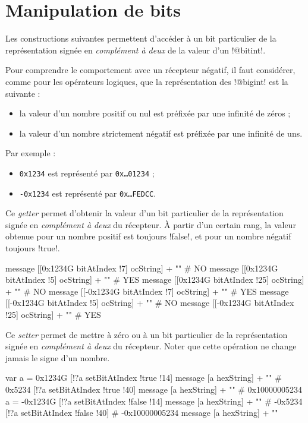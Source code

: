 \section{Manipulation de bits}

Les constructions suivantes permettent d'accéder à un bit particulier de la représentation signée en \emph{complément à deux} de la valeur d'un \ggs!@bitint!.

Pour comprendre le comportement avec un récepteur négatif, il faut considérer, comme pour les opérateurs logiques, que la représentation des \ggs!@bigint! est la suivante :
\begin{itemize}
  \item la valeur d'un nombre positif ou nul est préfixée par une infinité de zéros ;
  \item la valeur d'un nombre strictement négatif est préfixée par une infinité de uns.
\end{itemize}

Par exemple :
\begin{itemize}
  \item \texttt{0x1234} est représenté par \texttt{0x…01234} ;
  \item \texttt{-0x1234} est représenté par \texttt{0x…FEDCC}.
\end{itemize}


Ce \emph{getter} permet d'obtenir la valeur d'un bit particulier de la représentation signée en \emph{complément à deux} du récepteur. À partir d'un certain rang, la valeur obtenue pour un nombre positif est toujours \ggs!false!, et pour un nombre négatif toujours \ggs!true!.

\begin{galgas}
message [[0x1234G bitAtIndex !7] ocString] + "\n" # NO
message [[0x1234G bitAtIndex !5] ocString] + "\n" # YES
message [[0x1234G bitAtIndex !25] ocString] + "\n" # NO
message [[-0x1234G bitAtIndex !7] ocString] + "\n" # YES
message [[-0x1234G bitAtIndex !5] ocString] + "\n" # NO
message [[-0x1234G bitAtIndex !25] ocString] + "\n" # YES
\end{galgas}


Ce \emph{setter} permet de mettre à zéro ou à un bit particulier de la représentation signée en \emph{complément à deux} du récepteur. Noter que cette opération ne change jamais le signe d'un nombre.

\begin{galgas}
var a = 0x1234G
[!?a setBitAtIndex !true !14]
message [a hexString] + "\n" # 0x5234
[!?a setBitAtIndex !true !40]
message [a hexString] + "\n" # 0x10000005234
a = -0x1234G
[!?a setBitAtIndex !false !14]
message [a hexString] + "\n" # -0x5234
[!?a setBitAtIndex !false !40] # -0x10000005234
message [a hexString] + "\n"
\end{galgas}

